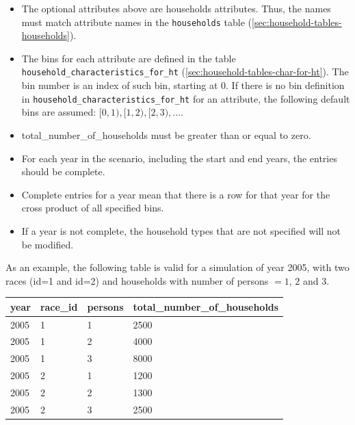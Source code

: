 \begin{itemize} \tight
\item The optional attributes above are households attributes. Thus, the names must match
attribute names in the {\tt households} table (\ref{sec:household-tables-households}).
\item The bins for each attribute are defined in the table {\tt household_characteristics_for_ht}
(\ref{sec:household-tables-char-for-ht}).
The bin number is an index of such bin, starting at 0. If there is no bin definition in {\tt household_characteristics_for_ht}
for an attribute, the following default bins are assumed: $[0,1), [1, 2), [2,3), \dots$.
\item total_number_of_households must be greater than or equal to zero.
\item For each year in the scenario, including the start and end years, the
entries should be complete.
\item Complete entries for a year mean that there is a row for that year for
the cross product of all specified bins.
\item If a year is not complete, the household types that are not specified
will not be modified.
\end{itemize}

As an example, the following table is valid for a simulation of year 2005, with two races (id=1 and id=2) and
households with number of persons $=1$, $2$ and $3$.

\begin{tabular}{|l|l|l|l|}
\hline
year &race_id &persons &total_number_of_households \\
\hline
2005 &1 &1 &2500 \\
\hline
2005 &1 &2 &4000 \\
\hline
2005 &1 &3 &8000 \\
\hline
2005 &2 &1 &1200 \\
\hline
2005 &2 &2 &1300 \\
\hline
2005 &2 &3 &2500 \\
\hline
\end{tabular}






